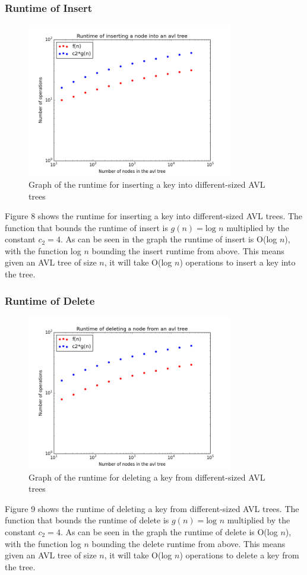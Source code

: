 \documentclass[12pt]{article}
\begin{document}
\subsubsection*{Runtime of Insert}
\begin{figure}[h]
\caption{Graph of the runtime for inserting a key into different-sized AVL
trees}
\includegraphics[width=9cm]{insert_runtime.png}
\centering
\end{figure}
\noindent
Figure 8 shows the runtime for inserting a key into different-sized AVL
trees.  The function that bounds the runtime of insert is $g(n)= \text{log }n$
multiplied by the constant $c_2=4$.  As can be seen in the graph the runtime of
insert is O(log $n$), with the function log $n$ bounding the insert runtime
from above.  This means given an AVL tree of size $n$, it will take O(log $n$)
operations to insert a key into the tree.

\subsubsection*{Runtime of Delete}
\begin{figure}[h]
\caption{Graph of the runtime for deleting a key from different-sized AVL
trees}
\includegraphics[width=9cm]{delete_runtime.png}
\centering
\end{figure}
\noindent
Figure 9 shows the runtime of deleting a key from different-sized AVL
trees.  The function that bounds the runtime of delete is $g(n)= \text{log }n$
multiplied by the constant $c_2=4$.  As can be seen in the graph the runtime of
delete is O(log $n$), with the function log $n$ bounding the delete runtime
from above.  This means given an AVL tree of size $n$, it will take O(log $n$)
operations to delete a key from the tree.
\end{document}

